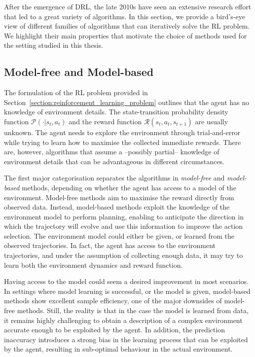 After the emergence of \acl{DRL}, the late 2010s have seen an extensive research effort that led to a great variety of algorithms.
In this section, we provide a bird's-eye view of different families of algorithms that can iteratively solve the \ac{RL} problem.
We highlight their main properties that motivate the choice of methods used for the setting studied in this thesis.

\subsection{Model-free and Model-based}

The formulation of the \ac{RL} problem provided in Section~\ref{section:reinforcement_learning_problem} outlines that the agent has no knowledge of environment details.
The state-transition probability density function $\mathcal{P}(\cdot|s_t, a_t)$ and the reward function $\mathcal{R}(s_t, a_t, s_{t+1})$ are usually unknown.
The agent needs to explore the environment through trial-and-error while trying to learn how to maximise the collected immediate rewards.
There are, however, algorithms that assume a --possibly partial-- knowledge of environment details that can be advantageous in different circumstances.

The first major categorisation separates the algorithms in \emph{model-free} and \emph{model-based} methods, depending on whether the agent has access to a model of the environment.
Model-free methods aim to maximise the reward directly from observed data.
Instead, model-based methods exploit the knowledge of the environment model to perform planning, enabling to anticipate the direction in which the trajectory will evolve and use this information to improve the action selection.
The environment model could either be given, or learned from the observed trajectories.
In fact, the agent has access to the environment trajectories, and under the assumption of collecting enough data, it may try to learn both the environment dynamics and reward function.

Having access to the model could seem a desired improvement in most scenarios.
In settings where model learning is successful, or the model is given, model-based methods show excellent sample efficiency, one of the major downsides of model-free methods.
Still, the reality is that in the case the model is learned from data, it remains highly challenging to obtain a description of a complex environment accurate enough to be exploited by the agent.
In addition, the prediction inaccuracy introduces a strong bias in the learning process that can be exploited by the agent, resulting in sub-optimal behaviour in the actual environment.

